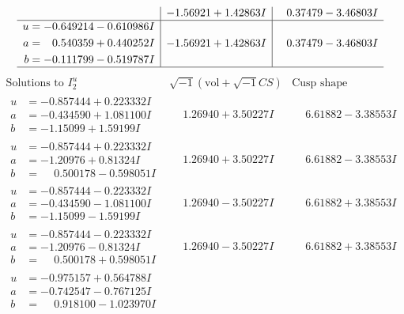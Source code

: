 \documentclass[1p]{elsarticle_modified}
\theoremstyle{definition}
\newcommand{\I}{\sqrt{-1}}
\begin{document}
$$\begin{array}{c|c|c}
 & -1.56921 + 1.42863 I & \phantom{-}0.37479 - 3.46803 I \\ \hline\begin{aligned}
u &= -0.649214 - 0.610986 I \\
a &= \phantom{-}0.540359 + 0.440252 I \\
b &= -0.111799 - 0.519787 I\end{aligned}
 & -1.56921 + 1.42863 I & \phantom{-}0.37479 - 3.46803 I\\
 \hline 
 \end{array}$$\newpage$$\begin{array}{c|c|c}  
\text{Solutions to }I^u_{2}& \I (\text{vol} + \sqrt{-1}CS) & \text{Cusp shape}\\
 \hline 
\begin{aligned}
u &= -0.857444 + 0.223332 I \\
a &= -0.434590 + 1.081100 I \\
b &= -1.15099 + 1.59199 I\end{aligned}
 & \phantom{-}1.26940 + 3.50227 I & \phantom{-}6.61882 - 3.38553 I \\ \hline\begin{aligned}
u &= -0.857444 + 0.223332 I \\
a &= -1.20976 + 0.81324 I \\
b &= \phantom{-}0.500178 - 0.598051 I\end{aligned}
 & \phantom{-}1.26940 + 3.50227 I & \phantom{-}6.61882 - 3.38553 I \\ \hline\begin{aligned}
u &= -0.857444 - 0.223332 I \\
a &= -0.434590 - 1.081100 I \\
b &= -1.15099 - 1.59199 I\end{aligned}
 & \phantom{-}1.26940 - 3.50227 I & \phantom{-}6.61882 + 3.38553 I \\ \hline\begin{aligned}
u &= -0.857444 - 0.223332 I \\
a &= -1.20976 - 0.81324 I \\
b &= \phantom{-}0.500178 + 0.598051 I\end{aligned}
 & \phantom{-}1.26940 - 3.50227 I & \phantom{-}6.61882 + 3.38553 I \\ \hline\begin{aligned}
u &= -0.975157 + 0.564788 I \\
a &= -0.742547 - 0.767125 I \\
b &= \phantom{-}0.918100 - 1.023970 I\end{aligned}

\end{array}$$
\end{document}
